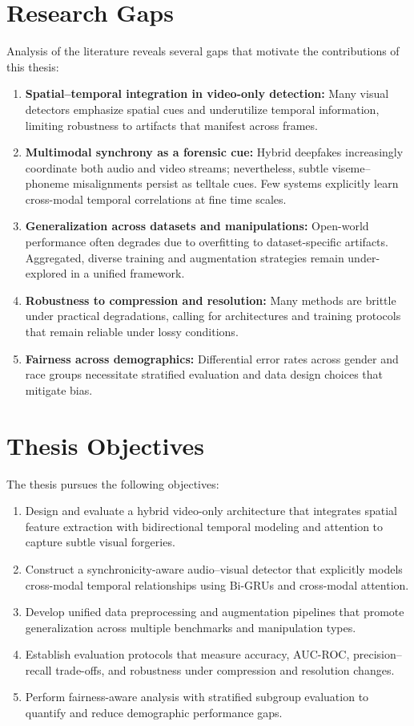 \section{Research Gaps}
Analysis of the literature reveals several gaps that motivate the contributions of this thesis:
\begin{enumerate}[leftmargin=*,label=(\alph*)]
    \item \textbf{Spatial–temporal integration in video-only detection:} Many visual detectors emphasize spatial cues and underutilize temporal information, limiting robustness to artifacts that manifest across frames.
    \item \textbf{Multimodal synchrony as a forensic cue:} Hybrid deepfakes increasingly coordinate both audio and video streams; nevertheless, subtle viseme–phoneme misalignments persist as telltale cues. Few systems explicitly learn cross-modal temporal correlations at fine time scales.
    \item \textbf{Generalization across datasets and manipulations:} Open-world performance often degrades due to overfitting to dataset-specific artifacts. Aggregated, diverse training and augmentation strategies remain under-explored in a unified framework.
    \item \textbf{Robustness to compression and resolution:} Many methods are brittle under practical degradations, calling for architectures and training protocols that remain reliable under lossy conditions.
    \item \textbf{Fairness across demographics:} Differential error rates across gender and race groups necessitate stratified evaluation and data design choices that mitigate bias.
\end{enumerate}

\section{Thesis Objectives}
The thesis pursues the following objectives:
\begin{enumerate}[leftmargin=*,label=\arabic*.]
    \item Design and evaluate a hybrid video-only architecture that integrates spatial feature extraction with bidirectional temporal modeling and attention to capture subtle visual forgeries.
    \item Construct a synchronicity-aware audio–visual detector that explicitly models cross-modal temporal relationships using Bi-GRUs and cross-modal attention.
    \item Develop unified data preprocessing and augmentation pipelines that promote generalization across multiple benchmarks and manipulation types.
    \item Establish evaluation protocols that measure accuracy, AUC-ROC, precision–recall trade-offs, and robustness under compression and resolution changes.
    \item Perform fairness-aware analysis with stratified subgroup evaluation to quantify and reduce demographic performance gaps.
\end{enumerate}

